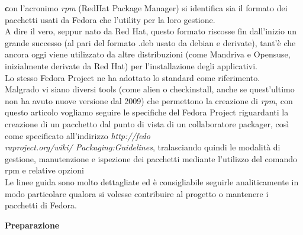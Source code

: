 \onehalfspacing
\lettrine[lines=1, loversize=0.1, lraise=0.1]{\color[cmyk]{0.5, 0, 1, 0}\bfseries c}{}on l'acronimo {\itshape rpm} (RedHat Package Manager) si identifica sia il formato dei pacchetti usati da Fedora che l'utility per la loro gestione.\\

A dire il vero, seppur nato da Red Hat, questo formato riscosse fin dall'inizio un grande successo (al pari del formato .deb usato da debian e derivate), tant'è che ancora oggi viene utilizzato da altre distribuzioni (come Mandriva e Opensuse, inizialmente derivate da Red Hat) per l'installazione degli applicativi.\\

Lo stesso Fedora Project ne ha adottato lo standard come riferimento.\\

Malgrado vi siano diversi tools (come alien o checkinstall, anche se quest'ultimo non ha avuto nuove versione dal 2009) che permettono la creazione di {\itshape rpm}, con questo articolo vogliamo seguire le specifiche del Fedora Project riguardanti la creazione di un pacchetto dal punto di vista di un collaboratore packager, così come specificato all'indirizzo {\itshape http://fedo\\raproject.org/wiki/ Packaging:Guidelines}, tralasciando quindi le modalità di gestione, manutenzione e ispezione dei pacchetti mediante l'utilizzo del comando rpm e relative opzioni\\

Le linee guida sono molto dettagliate ed è consigliabile seguirle analiticamente in modo particolare qualora si volesse contribuire al progetto o mantenere i pacchetti di Fedora.

\begin{center}
{\bfseries Preparazione}
\end{center}

